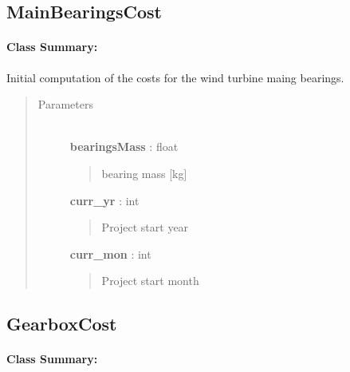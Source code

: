 \documentclass[letterpaper,10pt,openany,oneside]{sphinxmanual}
\begin{document}
\subsection{MainBearingsCost}
\label{documentation:mainbearingscost}\label{documentation:mainbearingscost-class-label}\paragraph{Class Summary:}

\begin{fulllineitems}
\label{documentation:turbine_costSE.src.nacelle_costsSE.MainBearingsCost}
Initial computation of the costs for the wind turbine maing bearings.
\begin{quote}\begin{description}
\item[{Parameters }] \leavevmode\\
\textbf{bearingsMass} : float
\begin{quote}

bearing mass {[}kg{]}
\end{quote}

\textbf{curr\_yr} : int
\begin{quote}

Project start year
\end{quote}

\textbf{curr\_mon} : int
\begin{quote}

Project start month
\end{quote}

\end{description}\end{quote}

\end{fulllineitems}



\subsection{GearboxCost}
\label{documentation:gearboxcost}\label{documentation:gearbox-class-label}\paragraph{Class Summary:}
\end{document}
